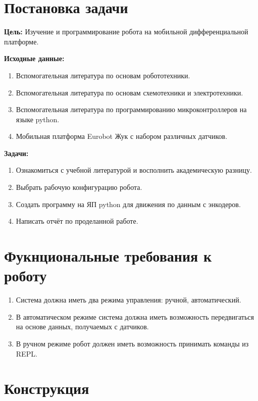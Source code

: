 \chapter{Постановка задачи}

\textbf{Цель:}
Изучение и программирование робота на мобильной дифференциальной платформе.

\textbf{Исходные данные:}
\begin{enumerate}
	\item Вспомогательная литература по основам робототехники.
	\item Вспомогательная литература по основам схемотехники и электротехники.
	\item Вспомогательная литература по программированию микроконтроллеров на языке python.
	\item Мобильная платформа Eurobot Жук с набором различных датчиков.
\end{enumerate}

\textbf{Задачи:}
\begin{enumerate}
	\item Ознакомиться с учебной литературой и восполнить академическую разницу.
	\item Выбрать рабочую конфигурацию робота.
	\item Создать программу на ЯП python для движения по данным с энкодеров.
	\item Написать отчёт по проделанной работе.
\end{enumerate}

\chapter{Фукнциональные требования к роботу}

\begin{enumerate}
	\item Система должна иметь два режима управления: ручной, автоматический.
	\item В автоматическом режиме система должна иметь возможность передвигаться на основе данных, получаемых с датчиков.
	\item В ручном режиме робот должен иметь возможность принимать команды из REPL.
\end{enumerate}

\chapter{Конструкция}
